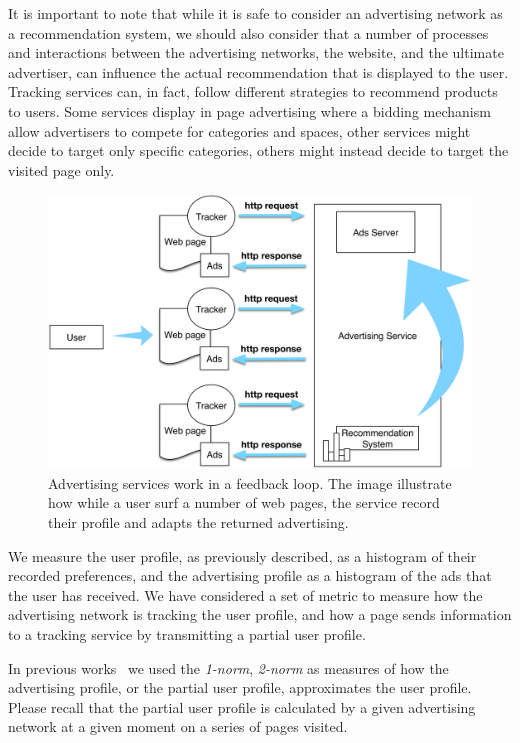 It is important to note that while it is safe to consider an advertising network as a recommendation system, we should also consider that a number of processes and interactions between the advertising networks, the website, and the ultimate advertiser, can influence the actual recommendation that is displayed to the user. Tracking services can, in fact, follow different strategies to recommend products to users. Some services display in page advertising where a bidding mechanism allow advertisers to compete for categories and spaces, other services might decide to target only specific categories, others might instead decide to target the visited page only.

\begin{figure}
\includegraphics[width=\textwidth]{figures/advertising-loop.png}
\caption[Advertising services feedback loop]{Advertising services work in a feedback loop. The image illustrate how while a user surf a number of web pages, the service record their profile and adapts the returned advertising.}
\label{fig:advertising-loop}
\end{figure}

We measure the user profile, as previously described, as a histogram of their recorded preferences, and the advertising profile as a histogram of the ads that the user has received. We have considered a set of metric to measure how the advertising network is tracking the user profile, and how a page sends information to a tracking service by transmitting a partial user profile.

In previous works\cite{puglisi2016web}~\cite{puglisi2015you} we used the \emph{1-norm}, \emph{2-norm} as measures of how the advertising profile, or the partial user profile, approximates the user profile. Please recall that the partial user profile is calculated by a given advertising network at a given moment on a series of pages visited.


